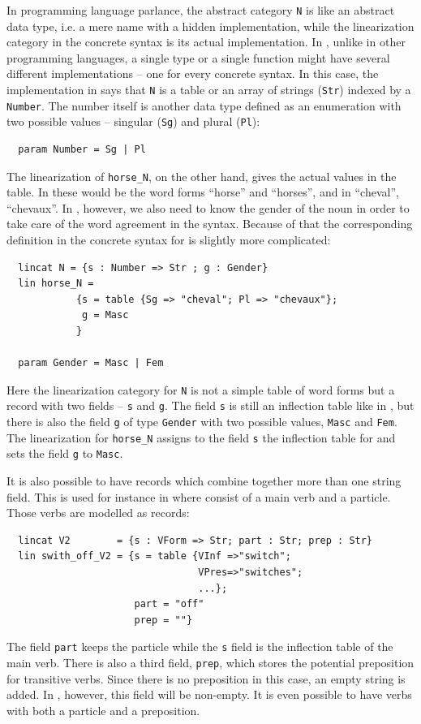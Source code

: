 \documentclass[output=paper]{langsci/langscibook}
\begin{document}
In programming language parlance, the abstract category \verb=N= 
is like an abstract data type, i.e. a mere name with 
a hidden implementation, while the linearization category in 
the concrete syntax is its actual implementation. 
In , unlike in other programming languages, a single type 
or a single function might have several different implementations -- 
one for every concrete syntax. In this case, the implementation in 
 says that \verb=N= is a table or an array of 
strings (\verb=Str=) indexed by a \verb=Number=. 
The number itself is another data type defined as an enumeration 
with two possible values -- singular (\verb=Sg=) and plural (\verb=Pl=):
\begin{verbatim}
  param Number = Sg | Pl
\end{verbatim}

The linearization of \verb=horse_N=, on the other hand, gives 
the actual values in the table. In  these would be 
the word forms ``horse'' and ``horses'', and in 
 ``cheval'', ``chevaux''. In , however, we also need to 
know the gender of the noun in order to take care of 
the word agreement in the syntax. Because of that 
the corresponding definition in the concrete syntax for  is slightly
more complicated:
\begin{verbatim}
  lincat N = {s : Number => Str ; g : Gender}
  lin horse_N = 
            {s = table {Sg => "cheval"; Pl => "chevaux"};
             g = Masc
            }

  param Gender = Masc | Fem
\end{verbatim}
Here the linearization category for \verb=N= is not a simple table of 
word forms but a record with two fields -- \verb=s= and \verb=g=. 
The field \verb=s= is still an inflection table like in , 
but there is also the field \verb=g= of type \verb=Gender= with 
two possible values, \verb=Masc= and \verb=Fem=. The linearization 
for \verb=horse_N= assigns to the field \verb=s= the inflection table 
for  and sets the field \verb=g= to \verb=Masc=.

It is also possible to have records which combine together more than 
one string field. This is used for instance in  
where  consist of a main verb and a particle. 
Those verbs are modelled as records:
\begin{verbatim}
  lincat V2        = {s : VForm => Str; part : Str; prep : Str}
  lin swith_off_V2 = {s = table {VInf =>"switch";
                                 VPres=>"switches";
                                 ...};
                      part = "off"
                      prep = ""}
\end{verbatim}
The field \verb=part= keeps the particle while the \verb=s= field is the inflection table of the main verb. There is also a third field, \verb=prep=, which stores the potential preposition for transitive verbs. Since there is no preposition in this case, an empty string is added. In , however, this field will be non-empty. It is even possible to have verbs with both a particle and a preposition.
\end{document}
